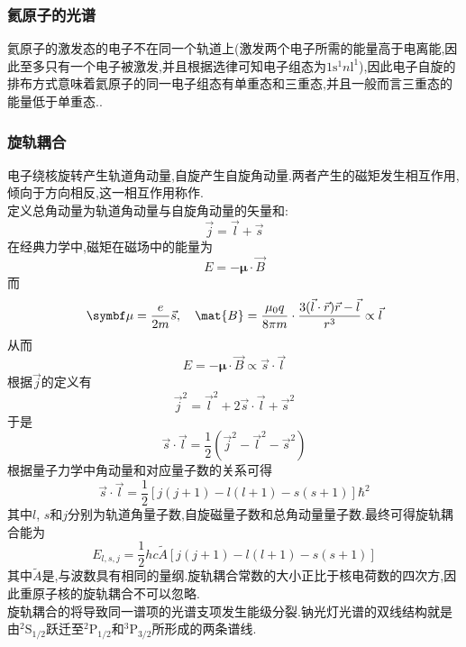 \documentclass{ctexbook}
\begin{document}
\subsubsection{氦原子的光谱}
氦原子的激发态的电子不在同一个轨道上(激发两个电子所需的能量高于电离能,因此至多只有一个电子被激发,并且根据选律可知电子组态为$1\text{s}^1n\text{l}^1$),因此电子自旋的排布方式意味着氦原子的同一电子组态有单重态和三重态,并且一般而言三重态的能量低于单重态..
\subsubsection{旋轨耦合}
电子绕核旋转产生轨道角动量,自旋产生自旋角动量.两者产生的磁矩发生相互作用,倾向于方向相反,这一相互作用称作.\\
\indent 定义总角动量为轨道角动量与自旋角动量的矢量和:
\[\vec{j}=\vec{l}+\vec{s}\]
在经典力学中,磁矩在磁场中的能量为
\[E=-\symbf\mu\cdot\vec{B}\]
而
\[\symbf\mu=\dfrac{e}{2m}\vec{s},\quad\mat{B}=\dfrac{\mu_0 q}{8\pi m}\cdot\dfrac{3(\vec{l}\cdot\vec{r})\vec{r}-\vec{l}}{r^3}\propto\vec{l}\]
从而
\[E=-\symbf\mu\cdot\vec{B}\propto\vec{s}\cdot\vec{l}\]
\indent 根据$\vec{j}$的定义有
\[\vec{j}^2=\vec{l}^2+2\vec{s}\cdot\vec{l}+\vec{s}^2\]
于是
\[\vec{s}\cdot\vec{l}=\dfrac12\left(\vec{j}^2-\vec{l}^2-\vec{s}^2\right)\]
根据量子力学中角动量和对应量子数的关系可得
\[\vec{s}\cdot\vec{l}=\dfrac12\left[j(j+1)-l(l+1)-s(s+1)\right]\hbar^2\]
其中$l$, $s$和$j$分别为轨道角量子数,自旋磁量子数和总角动量量子数.最终可得旋轨耦合能为
\[E_{l,s,j}=\dfrac12hc\tilde{A}\left[j(j+1)-l(l+1)-s(s+1)\right]\]
其中$\tilde{A}$是,与波数具有相同的量纲.旋轨耦合常数的大小正比于核电荷数的四次方,因此重原子核的旋轨耦合不可以忽略.\\
\indent 旋轨耦合的将导致同一谱项的光谱支项发生能级分裂.钠光灯光谱的双线结构就是由$^2\text{S}_{1/2}$跃迁至$^2\text{P}_{1/2}$和$^3\text{P}_{3/2}$所形成的两条谱线.
\end{document}
